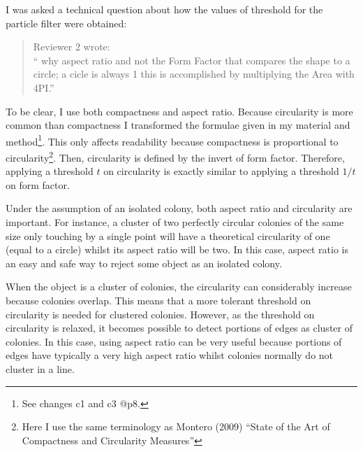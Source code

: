 \documentclass{letter}
\makeatletter
\newcommand{\CCircuForm}{c1 and c3 @p8}
\makeatother
\begin{document}
\begin{letter}{}
I was asked a technical question about 
how the values of threshold for the particle filter were obtained:
\begin{quote}
Reviewer 2 wrote:\\
`` why aspect ratio and not the Form Factor that compares the shape to a circle; a cicle is always 1
 this is accomplished by multiplying the Area with 4PI.''
\end{quote}
To be clear, I use both compactness and aspect ratio.
Because circularity is more common than compactness 
I transformed the formulae given in my material and 
method\footnote{See changes \CCircuForm{}.}.
This only affects readability because compactness is proportional to 
circularity\footnote{Here I use the same terminology as
Montero (2009) ``State of the Art of
Compactness and Circularity Measures''}.
Then, circularity is defined by the invert of form factor. 
Therefore, applying a threshold $t$ on circularity is
exactly similar to applying a threshold $1/t$ on form factor. 	

Under the assumption of an isolated colony, both aspect ratio and circularity are important. 
For instance, a cluster of two perfectly circular colonies of the same size only touching
by a single point will have a theoretical circularity of one (equal to a circle) whilst its
aspect ratio will be two. 
In this case, aspect ratio is an easy and safe way to reject some object as an isolated colony.

When the object is a cluster of colonies, the circularity can
considerably increase because colonies overlap. 
This means that a more tolerant threshold on circularity is needed for clustered colonies.
However, as the threshold on circularity is relaxed, 
it becomes possible to detect portions of edges as cluster of colonies.
In this case, using aspect ratio can be very useful because portions
 of edges have typically a very high aspect ratio whilst colonies normally do not cluster in a line.



\end{letter}
\end{document}
